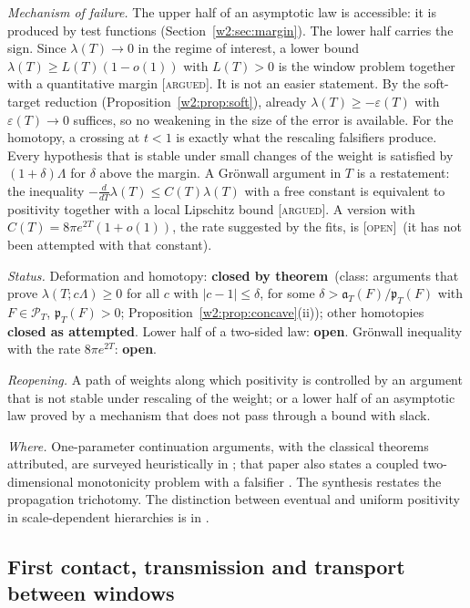 \documentclass[11pt]{amsart}
\theoremstyle{definition}
\theoremstyle{remark}
\numberwithin{equation}{section}
\newcommand{\PT}{\mathcal{P}_T}                        %
\newcommand{\pT}{\mathfrak{p}_T}                       %
\newcommand{\aT}{\mathfrak{a}_T}                       %
\newcommand{\lam}{\lambda(T)}                          %
\newcommand{\stag}[1]{\textsc{[#1]}}
\newcommand{\ARGUED}{\stag{argued}}
\newcommand{\OPENQ}{\stag{open}}
\newcommand{\rtag}[1]{\textbf{\small\textsf{#1}}}
\newcommand{\closedT}{\rtag{closed by theorem}}
\newcommand{\closedA}{\rtag{closed as attempted}}
\newcommand{\openR}{\rtag{open}}
\newcommand{\entry}[1]{\par\smallskip\noindent\textit{#1.}\enspace}
\begin{document}
\entry{Mechanism of failure} The upper half of an asymptotic law is accessible: it is produced by test functions
(Section~\ref{w2:sec:margin}). The lower half carries the sign. Since $\lam\to0$ in the regime of interest, a lower
bound $\lam\ge L(T)(1-o(1))$ with $L(T)>0$ is the window problem together with a quantitative margin \ARGUED. It is
not an easier statement. By the soft-target reduction (Proposition~\ref{w2:prop:soft}), already $\lam\ge-\varepsilon(T)$
with $\varepsilon(T)\to0$ suffices, so no weakening in the size of the error is available. For the homotopy, a
crossing at $t<1$ is exactly what the rescaling falsifiers produce. Every hypothesis that is stable under small changes
of the weight is satisfied by $(1+\delta)\Lambda$ for $\delta$ above the margin. A Gr\"onwall argument in $T$ is a
restatement: the inequality $-\frac{d}{dT}\lam\le C(T)\lam$ with a free constant is equivalent to positivity together
with a local Lipschitz bound \ARGUED. A version with $C(T)=8\pi e^{2T}(1+o(1))$, the rate suggested by the fits, is
\OPENQ\ (it has not been attempted with that constant).

\entry{Status} Deformation and homotopy: \closedT\ (class: arguments that prove $\lambda(T;c\Lambda)\ge0$ for all
$c$ with $|c-1|\le\delta$, for some $\delta>\aT(F)/\pT(F)$ with $F\in\PT$, $\pT(F)>0$;
Proposition~\ref{w2:prop:concave}(ii)); other homotopies \closedA. Lower half of a two-sided law: \openR. Gr\"onwall inequality with the rate $8\pi e^{2T}$:
\openR.

\entry{Reopening} A path of weights along which positivity is controlled by an argument that is not stable under
rescaling of the weight; or a lower half of an asymptotic law proved by a mechanism that does not pass through a bound
with slack.

\entry{Where} One-parameter continuation arguments, with the classical theorems attributed, are surveyed heuristically
in \cite{P27}; that paper also states a coupled two-dimensional monotonicity problem with a falsifier
\cite[Problem~6.1]{P27}. The synthesis \cite{P29} restates the propagation trichotomy. The distinction between
eventual and uniform positivity in scale-dependent hierarchies is in \cite[Theorem~3.1]{P15}.

\subsection{First contact, transmission and transport between windows}\label{w8:fam:R25}
\end{document}
